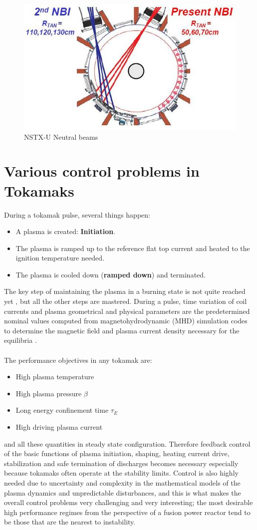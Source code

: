 \documentclass[12pt,lot, lof]{puthesis}
\begin{document}
\begin{figure}
\centering
\includegraphics[width= 0.6\linewidth]{NSTXU}
\caption{NSTX-U Neutral beams}
\label{nstxu}
\end{figure}

\section{Various control problems in Tokamaks}

During a tokamak pulse, several things happen:
\begin{itemize}
\item A plasma is created: \textbf{Initiation}.
\item The plasma is ramped up to the reference flat top current and heated to the ignition temperature needed.
\item The plasma is cooled down (\textbf{ramped down}) and terminated.
\end{itemize} 
The key step of maintaining the plasma in a burning state is not quite reached yet \cite{Green03}, but all the other steps are mastered. During a pulse, time variation of coil currents and plasma geometrical and physical parameters are the predetermined nominal values computed from magnetohydrodynamic (MHD) simulation codes to determine the magnetic field and plasma current density necessary for the equilibria \cite{Lao85, Takeda91, Lao05}.\\\\
%
The performance objectives in any tokamak are:
\begin{itemize}
\item High plasma temperature
\item High plasma pressure $\beta$ 
\item Long energy confinement time $\tau_E$ 
\item High driving plasma current
\end{itemize}
and all these quantities in steady state configuration. Therefore feedback control of the basic functions of plasma initiation, shaping, heating current drive, stabilization and safe termination of discharges becomes necessary especially because tokamaks often operate at the stability limits. Control is also highly needed due to uncertainty and complexity in the mathematical models of the plasma dynamics and unpredictable disturbances, and this is what makes the overall control problems very challenging and very interesting; the most desirable high performance regimes from the perspective of a fusion power reactor tend to be those that are the nearest to instability.
\end{document}
